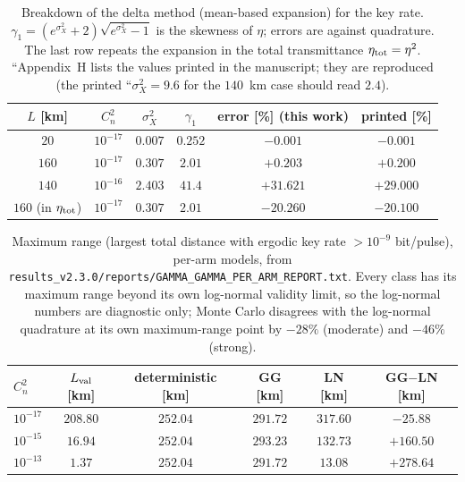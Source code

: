 \documentclass[11pt,a4paper]{article}
\theoremstyle{plain}
\theoremstyle{remark}
\begin{document}
\begin{table}[htbp]
\centering\small
\caption{Breakdown of the delta method (mean-based expansion) for the key rate. $\gamma_1=(e^{\sigma_X^2}+2)\sqrt{e^{\sigma_X^2}-1}$ is the skewness of $\eta$; errors are against quadrature. The last row repeats the expansion in the total transmittance $\eta_{\rm tot}=\eta^2$. ``Appendix~H lists the values printed in the manuscript; they are reproduced (the printed ``$\sigma_X^2=9.6$ for the $140$~km case should read $2.4$).}
\label{tab:delta}
\begin{tabular}{cccccc}
\toprule
$L$ [km] & $C_n^2$ & $\sigma_X^2$ & $\gamma_1$ & error [\%] (this work) & printed [\%]\\
\midrule
$20$ & $10^{-17}$ & $0.007$ & $0.252$ & $-0.001$ & $-0.001$ \\
$160$ & $10^{-17}$ & $0.307$ & $2.01$ & $+0.203$ & $+0.200$ \\
$140$ & $10^{-16}$ & $2.403$ & $41.4$ & $+31.621$ & $+29.000$ \\
$160$ (in $\eta_{\rm tot}$) & $10^{-17}$ & $0.307$ & $2.01$ & $-20.260$ & $-20.100$ \\

\bottomrule
\end{tabular}
\end{table}

\begin{table}[htbp]
\centering\small
\caption{Maximum range (largest total distance with ergodic key rate $>10^{-9}$ bit/pulse), per-arm models, from \texttt{results\_v2.3.0/reports/GAMMA\_GAMMA\_PER\_ARM\_REPORT.txt}. Every class has its maximum range beyond its own log-normal validity limit, so the log-normal numbers are diagnostic only; Monte Carlo disagrees with the log-normal quadrature at its own maximum-range point by $-28\%$ (moderate) and $-46\%$ (strong).}
\label{tab:range-ln}
\begin{tabular}{lccccc}
\toprule
$C_n^2$ & $L_{\rm val}$ [km] & deterministic [km] & GG [km] & LN [km] & GG$-$LN [km] \\
\midrule
$10^{-17}$ & $208.80$ & $252.04$ & $291.72$ & $317.60$ & $-25.88$ \\
$10^{-15}$ & $16.94$ & $252.04$ & $293.23$ & $132.73$ & $+160.50$ \\
$10^{-13}$ & $1.37$ & $252.04$ & $291.72$ & $13.08$ & $+278.64$ \\
\bottomrule
\end{tabular}
\end{table}
\end{document}
